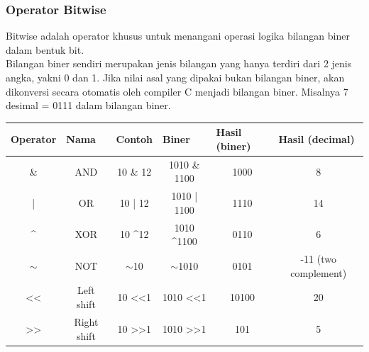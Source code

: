 \subsubsection{Operator Bitwise}
Bitwise adalah operator khusus untuk menangani operasi logika bilangan biner dalam bentuk bit. \\
Bilangan biner sendiri merupakan jenis bilangan yang hanya terdiri dari 2 jenis angka, yakni 0 dan 1.
Jika nilai asal yang dipakai bukan bilangan biner, akan dikonversi secara otomatis oleh compiler C menjadi bilangan biner. Misalnya 7 desimal = 0111 dalam bilangan biner.
\\
\begin{center}
	\begin{tabular}{|c|c|c|c|c|c|}
	\hline
	\multicolumn{1}{|l|}{Operator} & \multicolumn{1}{|l|}{Nama} & \multicolumn{1}{|l|}{Contoh} & \multicolumn{1}{|l|}{Biner} & \multicolumn{1}{|l|}{Hasil (biner)} & \multicolumn{1}{|l|}{Hasil (decimal)} \\ \hline
	\&                                    & AND                               & 10 \& 12                            & 1010 \& 1100                       & 1000                                       & 8                                            \\ \hline
	|                                     & OR                                & 10 | 12                             & 1010 | 1100                        & 1110                                       & 14                                           \\ \hline
	\textasciicircum{}                    & XOR                               & 10 \textasciicircum 12              & 1010 \textasciicircum 1100         & 0110                                       & 6                                            \\ \hline
	$\sim$                                & NOT                               & $\sim$10                            & $\sim$1010                         & 0101                                       & -11 (two complement)                         \\ \hline
	\textless{}\textless{}                & Left shift                        & 10 \textless{}\textless 1           & 1010 \textless{}\textless 1        & 10100                                      & 20                                           \\ \hline
	\textgreater{}\textgreater{}          & Right shift                       & 10 \textgreater{}\textgreater 1     & 1010 \textgreater{}\textgreater 1  & 101                                        & 5                                            \\ \hline
	\end{tabular}
\end{center}

